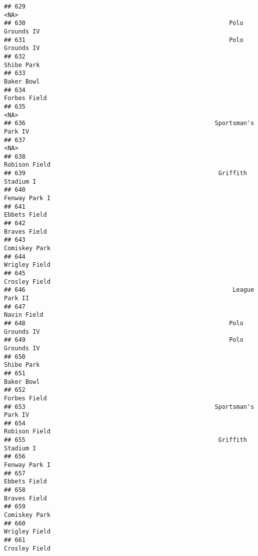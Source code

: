 \documentclass[]{article}
\begin{document}
\begin{verbatim}
## 629                                                                    <NA>
## 630                                                         Polo Grounds IV
## 631                                                         Polo Grounds IV
## 632                                                              Shibe Park
## 633                                                              Baker Bowl
## 634                                                            Forbes Field
## 635                                                                    <NA>
## 636                                                     Sportsman's Park IV
## 637                                                                    <NA>
## 638                                                           Robison Field
## 639                                                      Griffith Stadium I
## 640                                                           Fenway Park I
## 641                                                            Ebbets Field
## 642                                                            Braves Field
## 643                                                           Comiskey Park
## 644                                                           Wrigley Field
## 645                                                           Crosley Field
## 646                                                          League Park II
## 647                                                             Navin Field
## 648                                                         Polo Grounds IV
## 649                                                         Polo Grounds IV
## 650                                                              Shibe Park
## 651                                                              Baker Bowl
## 652                                                            Forbes Field
## 653                                                     Sportsman's Park IV
## 654                                                           Robison Field
## 655                                                      Griffith Stadium I
## 656                                                           Fenway Park I
## 657                                                            Ebbets Field
## 658                                                            Braves Field
## 659                                                           Comiskey Park
## 660                                                           Wrigley Field
## 661                                                           Crosley Field

\end{verbatim}
\end{document}
